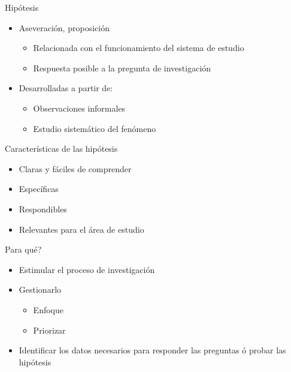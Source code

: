 \documentclass[
  11pt,
  ignorenonframetext,
]{beamer}
\begin{document}
\begin{frame}{Hipótesis}
\protect\hypertarget{hipuxf3tesis}{}
\begin{itemize}
\item
  Aseveración, proposición

  \begin{itemize}
  \item
    Relacionada con el funcionamiento del sistema de estudio
  \item
    Respuesta posible a la pregunta de investigación
  \end{itemize}
\item
  Desarrolladas a partir de:

  \begin{itemize}
  \item
    Observaciones informales
  \item
    Estudio sistemático del fenómeno
  \end{itemize}
\end{itemize}
\end{frame}

\begin{frame}{Características de las hipótesis}
\protect\hypertarget{caracteruxedsticas-de-las-hipuxf3tesis}{}
\begin{itemize}
\item
  Claras y fáciles de comprender
\item
  Específicas
\item
  Respondibles
\item
  Relevantes para el área de estudio
\end{itemize}
\end{frame}

\begin{frame}{Para qué?}
\protect\hypertarget{para-quuxe9}{}
\begin{itemize}
\item
  Estimular el proceso de investigación
\item
  Gestionarlo

  \begin{itemize}
  \item
    Enfoque
  \item
    Priorizar
  \end{itemize}
\item
  Identificar los datos necesarios para responder las preguntas ó probar
  las hipótesis
\end{itemize}
\end{frame}
\end{document}
